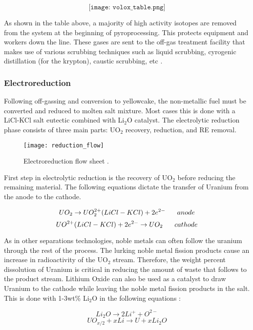 \[ \texttt{[image: volox\_table.png]} \]

As shown in the table above, a majority of high activity isotopes are removed from the system at the beginning of pyroprocessing. This protects equipment and workers down the line. These gases are sent to the off-gas treatment facility that makes use of various scrubbing techniques such as liquid scrubbing, cyrogenic distillation (for the krypton), caustic scrubbing, etc \cite{jubin_spent_2009}.

\subsubsection{Electroreduction}
Following off-gassing and conversion to yellowcake, the non-metallic fuel must be converted and reduced to molten salt mixture. Most cases this is done with a LiCl-KCl salt eutectic combined with Li$_2$O catalyst. The electrolytic reduction phase consists of three main parts: UO$_2$ recovery, reduction, and RE removal.

\begin{figure}[h]
	\centering
	\texttt{[image: reduction\_flow]}
	\caption{Electroreduction flow sheet \cite{ohta}.}
\end{figure}

First step in electrolytic reduction is the recovery of UO$_2$ before reducing the remaining material.
The following equations dictate the transfer of Uranium from the anode to the cathode.

\[ UO_2 \rightarrow UO_2^{2+}(LiCl-KCl) + 2e^{2-} \hspace{6mm} anode \]
\[ UO^{2+}(LiCl-KCl) + 2e^{2-} \rightarrow UO_2 \hspace{6mm} cathode \]

As in other separations technologies, noble metals can often follow the uranium through the rest of the process.
The lurking noble metal fission products cause an increase in radioactivity of the UO$_2$ stream. 
Therefore, the weight percent dissolution of Uranium is critical in reducing the amount of waste that follows to the product stream.
Lithium Oxide can also be used as a catalyst to draw Uranium to the cathode while leaving the noble metal fission products in the salt.
This is done with 1-3wt\% Li$_2$O in the following equations \cite{hur_electrochemical_nodate}:

\[ Li_2O \rightarrow 2Li^+ + O^{2-} \]
\[ UO_{x/2} + xLi \rightarrow U + xLi_2O \]

